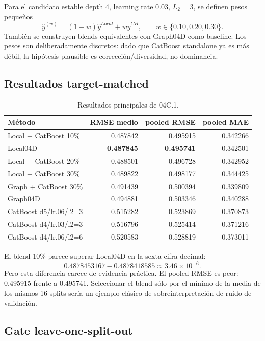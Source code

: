Para el candidato estable depth 4, learning rate 0.03, $L_2=3$, se definen pesos pequeños
\[
\hat y^{(w)}
=
(1-w)\hat y^{Local}
+w\hat y^{CB},
\qquad
w\in\{0.10,0.20,0.30\}.
\]
También se construyen blends equivalentes con Graph04D como baseline. Los pesos son
deliberadamente discretos: dado que CatBoost standalone ya es más débil, la hipótesis plausible
es corrección/diversidad, no dominancia.

\subsection{Resultados target-matched}

\begin{table}[H]
\centering
\caption{Resultados principales de 04C.1.}
\label{tab:cp04c-results}
\small
\begin{tabular}{lrrr}
\toprule
Método & RMSE medio & pooled RMSE & pooled MAE \\
\midrule
Local + CatBoost 10\% & 0.487842 & 0.495915 & 0.342266 \\
Local04D & \textbf{0.487845} & \textbf{0.495741} & 0.342501 \\
Local + CatBoost 20\% & 0.488501 & 0.496728 & 0.342952 \\
Local + CatBoost 30\% & 0.489822 & 0.498177 & 0.344425 \\
Graph + CatBoost 30\% & 0.491439 & 0.500394 & 0.339809 \\
Graph04D & 0.494881 & 0.503346 & 0.340288 \\
CatBoost d5/lr.06/l2=3 & 0.515282 & 0.523869 & 0.370873 \\
CatBoost d4/lr.03/l2=3 & 0.516796 & 0.525414 & 0.371216 \\
CatBoost d4/lr.06/l2=6 & 0.520583 & 0.528819 & 0.373011 \\
\bottomrule
\end{tabular}
\end{table}

El blend 10\% parece superar Local04D en la sexta cifra decimal:
\[
0.4878453167-0.4878418585
\approx3.46\times10^{-6}.
\]
Pero esta diferencia carece de evidencia práctica. El pooled RMSE es peor:
0.495915 frente a 0.495741. Seleccionar el blend sólo por el mínimo de la media de los mismos
16 splits sería un ejemplo clásico de sobreinterpretación de ruido de validación.

\subsection{Gate leave-one-split-out}

